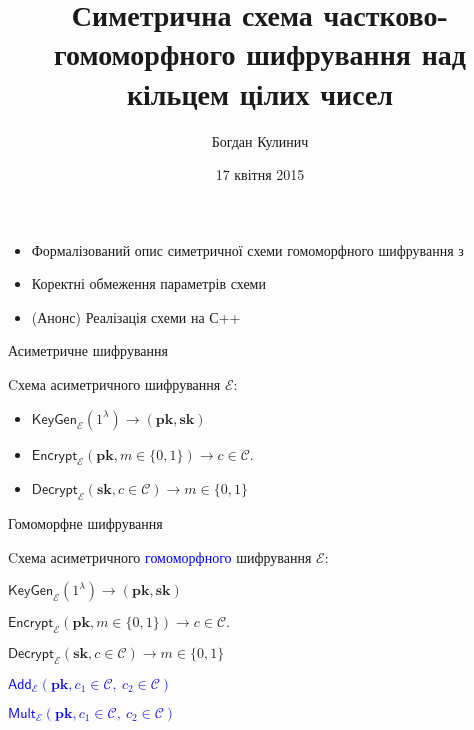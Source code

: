 \documentclass[pdf]{beamer}
\title{Симетрична схема частково-гомоморфного шифрування над кільцем цілих чисел}
\date[2015]{17 квітня 2015}
\author{Богдан Кулинич}
\begin{document}
\begin{frame}
\titlepage
\end{frame}


\begin{frame}{}

\begin{itemize}
	
	\item Формалізований опис симетричної схеми гомоморфного шифрування з \cite{YKPB13}
	\item Коректні обмеження параметрів схеми
	\item (Анонс) Реалізація схеми на С++
	
\end{itemize}

\end{frame}


\begin{frame}{Асиметричне шифрування}

Cхема асиметричного шифрування \( \mathcal{E} \):

\begin{itemize}
	
	\item \( \mathsf{KeyGen}_\mathcal{E}( 1^\lambda ) \rightarrow ( \mathbf{pk}, \mathbf{sk} ) \)
	\item \( \mathsf{Encrypt}_\mathcal{E}( \mathbf{pk}, m \in \{0, 1\} ) \rightarrow c \in \mathcal{C}. \)
	\item \( \mathsf{Decrypt}_\mathcal{E}( \mathbf{sk}, c \in \mathcal{C} ) \rightarrow m \in \{ 0, 1 \} \)
	
\end{itemize}

\end{frame}


\begin{frame}{Гомоморфне шифрування}

Cхема асиметричного \textcolor{blue}{гомоморфного} шифрування \( \mathcal{E} \):

\begin{itemize}
	
	\item \( \mathsf{KeyGen}_\mathcal{E}( 1^\lambda ) \rightarrow ( \mathbf{pk}, \mathbf{sk} ) \)
	\item \( \mathsf{Encrypt}_\mathcal{E}( \mathbf{pk}, m \in \{0, 1\} ) \rightarrow c \in \mathcal{C}. \)
	\item \( \mathsf{Decrypt}_\mathcal{E}( \mathbf{sk}, c \in \mathcal{C} ) \rightarrow m \in \{ 0, 1 \} \)
	\textcolor{blue}{
	\item \( \mathsf{Add}_\mathcal{E}( \mathbf{pk} , c_1 \in \mathcal{C}, ~ c_2 \in \mathcal{C} ) \)
	\item \( \mathsf{Mult}_\mathcal{E}( \mathbf{pk} , c_1 \in \mathcal{C}, ~ c_2 \in \mathcal{C} ) \)}
	
\end{itemize}
\end{frame}
\end{document}
